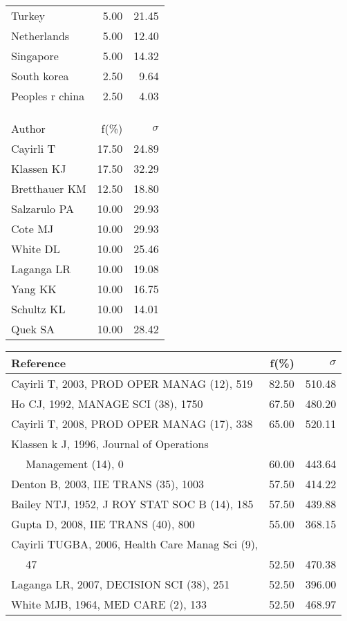 \documentclass[a4paper,11pt]{report}
\begin{document}
\begin{landscape}
\begin{table}[!ht]
{\begin{tabular}{|l r r|}
Turkey & 5.00 & 21.45\\
Netherlands & 5.00 & 12.40\\
Singapore & 5.00 & 14.32\\
South korea & 2.50 & 9.64\\
Peoples r china & 2.50 & 4.03\\
 &  & \\
 &  & \\
 &  & \\
\hline
\hline
Author & f(\%) & $\sigma$\\
\hline
Cayirli T & 17.50 & 24.89\\
Klassen KJ & 17.50 & 32.29\\
Bretthauer KM & 12.50 & 18.80\\
Salzarulo PA & 10.00 & 29.93\\
Cote MJ & 10.00 & 29.93\\
White DL & 10.00 & 25.46\\
Laganga LR & 10.00 & 19.08\\
Yang KK & 10.00 & 16.75\\
Schultz KL & 10.00 & 14.01\\
Quek SA & 10.00 & 28.42\\
\hline
\end{tabular}
}
{\scriptsize\begin{tabular}{|l r r|}
\hline
Reference & f(\%) & $\sigma$\\
\hline
Cayirli T, 2003, PROD OPER MANAG (12), 519 & 82.50 & 510.48\\
Ho CJ, 1992, MANAGE SCI (38), 1750 & 67.50 & 480.20\\
Cayirli T, 2008, PROD OPER MANAG (17), 338 & 65.00 & 520.11\\
Klassen k J, 1996, Journal of Operations &  & \\
$\quad$ Management (14), 0 & 60.00 & 443.64\\
Denton B, 2003, IIE TRANS (35), 1003 & 57.50 & 414.22\\
Bailey NTJ, 1952, J ROY STAT SOC B (14), 185 & 57.50 & 439.88\\
Gupta D, 2008, IIE TRANS (40), 800 & 55.00 & 368.15\\
Cayirli TUGBA, 2006, Health Care Manag Sci (9), &  & \\
$\quad$ 47 & 52.50 & 470.38\\
Laganga LR, 2007, DECISION SCI (38), 251 & 52.50 & 396.00\\
White MJB, 1964, MED CARE (2), 133 & 52.50 & 468.97\\

\end{tabular}}
\end{table}
\end{landscape}
\end{document}
